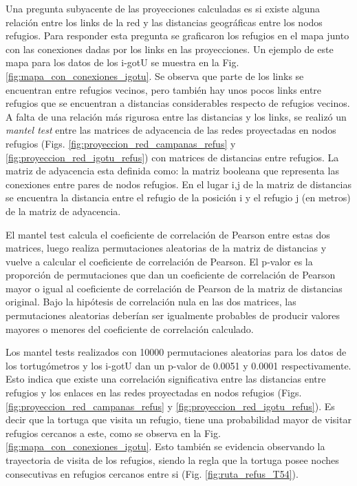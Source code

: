 Una pregunta subyacente de las proyecciones calculadas es si existe alguna relación entre los links de la red y las distancias geográficas entre los nodos refugios. Para responder esta pregunta se graficaron los refugios en el mapa junto con las conexiones dadas por los links en las proyecciones. Un ejemplo de este mapa para los datos de los i-gotU se muestra en la Fig. \ref{fig:mapa_con_conexiones_igotu}. Se observa que parte de los links se encuentran entre refugios vecinos, pero también hay unos pocos links entre refugios que se encuentran a distancias considerables respecto de refugios vecinos. A falta de una relación más rigurosa entre las distancias y los links, se realizó un \textit{mantel test} \cite{MantelTest} entre las matrices de adyacencia de las redes proyectadas en nodos refugios (Figs. \ref{fig:proyeccion_red_campanas_refus} y \ref{fig:proyeccion_red_igotu_refus}) con matrices de distancias entre refugios. La matriz de adyacencia esta definida como: la matriz booleana que representa las conexiones entre pares de nodos refugios. En el lugar i,j de la matriz de distancias se encuentra la distancia entre el refugio  de la posición i y el refugio j (en metros) de la matriz de adyacencia.
 
El mantel test calcula el coeficiente de correlación de Pearson entre estas dos matrices, luego realiza permutaciones aleatorias de la matriz de distancias y vuelve a calcular el coeficiente de correlación de Pearson. El p-valor es la proporción de permutaciones que dan un coeficiente de correlación de Pearson mayor o igual al coeficiente de correlación de Pearson de la matriz de distancias original. Bajo la hipótesis de correlación nula en las dos matrices, las permutaciones aleatorias deberían ser igualmente probables de producir valores mayores o menores del coeficiente de correlación calculado.
 
 
Los mantel tests realizados con 10000 permutaciones aleatorias para los datos de los tortugómetros y los i-gotU dan un p-valor de 0.0051 y 0.0001 respectivamente. Esto indica que existe una correlación significativa entre las distancias entre refugios y los enlaces en las redes proyectadas en nodos refugios (Figs. \ref{fig:proyeccion_red_campanas_refus} y \ref{fig:proyeccion_red_igotu_refus}). Es decir que la tortuga que visita un refugio, tiene una probabilidad mayor de visitar refugios cercanos a este, como se observa en la Fig. \ref{fig:mapa_con_conexiones_igotu}. Esto también se evidencia observando la trayectoria de visita de los refugios, siendo la regla que la tortuga posee noches consecutivas en refugios cercanos entre si (Fig. \ref{fig:ruta_refus_T54}).
 
